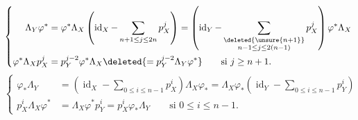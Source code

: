 \[
\left\{\begin{aligned}
\Lambda_Y\varphi^*&=\varphi^*\Lambda_X\left(\operatorname{id}_X-\sum_{n+1\leq j\leq2n}p_X^j\right)
=\left(\operatorname{id}_Y-\sum_{\substack{\deleted{\unsure{n+1}}\\n-1\leq j\leq2(n-1)}}p_X^j\right)\varphi^*\Lambda_X\\
\varphi^*\Lambda_Xp_X^j&=p_Y^{j-2}\varphi^*\Lambda_X\deleted{=p_Y^{j-2}\Lambda_Y\varphi^*}
\qquad\text{si }j\geq n+1.
\end{aligned}\right.
\]
\[
\left\{\begin{aligned}
\varphi_*\Lambda_Y&=\left(\operatorname{id}_X-\sum_{0\leq i\leq n-1}p_X^i\right)\Lambda_X\varphi_*
=\Lambda_X\varphi_*\left(\operatorname{id}_Y-\sum_{0\leq i\leq n-1}p_Y^i\right)\\
p_X^i\Lambda_X\varphi^*&=\Lambda_X\varphi^*p_Y^i=p_X^i\varphi_*\Lambda_Y\qquad\text{si }0\leq i\leq n-1.
\end{aligned}\right.
\]
